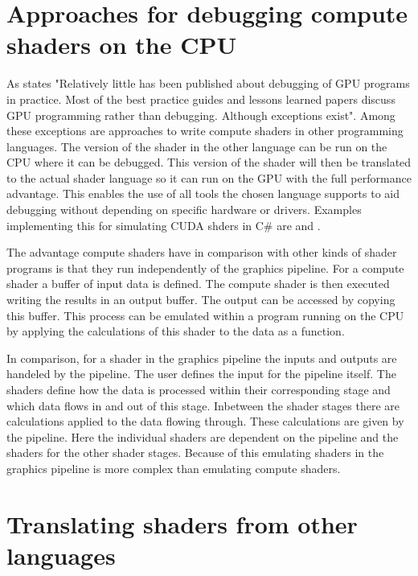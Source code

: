 \section{Approaches for debugging compute shaders on the CPU}
\label{section:computeApproaches}

As  states "Relatively little has been published about debugging of GPU programs  in  practice.  Most  of  the  best  practice  guides  and lessons learned papers discuss GPU programming rather than debugging. Although exceptions exist". Among these exceptions are approaches to write compute shaders in other programming languages. The version of the shader in the other language can be run on the CPU where it can be debugged. This version of the shader will then be translated to the actual shader language so it can run on the GPU with the full performance advantage. This enables the use of all tools the chosen language supports to aid debugging without depending on specific hardware or drivers.
Examples implementing this for simulating CUDA shders in C\# are  and .

The advantage compute shaders have in comparison with other kinds of shader programs is that they run independently of the graphics pipeline. For a compute shader a buffer of input data is defined. The compute shader is then executed writing the results in an output buffer. The output can be accessed by copying this buffer. This process can be emulated within a program running on the CPU by applying the calculations of this shader to the data as a function.

In comparison, for a shader in the graphics pipeline the inputs and outputs are handeled by the pipeline. The user defines the input for the pipeline itself. The shaders define how the data is processed within their corresponding stage and which data flows in and out of this stage. Inbetween the shader stages there are calculations applied to the data flowing through. These calculations are given by the pipeline. Here the individual shaders are dependent on the pipeline and the shaders for the other shader stages. Because of this emulating shaders in the graphics pipeline is more complex than emulating compute shaders.

\section{Translating shaders from other languages}\label{section:translating}


